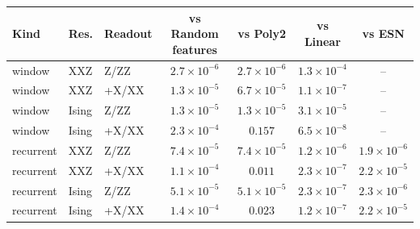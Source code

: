 \begin{tabular}{lllcccc}
\toprule
Kind & Res. & Readout & vs Random features & vs Poly2 & vs Linear & vs ESN \\
\midrule
window & XXZ & Z/ZZ & $2.7\times10^{-6}$ & $2.7\times10^{-6}$ & $1.3\times10^{-4}$ & -- \\
window & XXZ & +X/XX & $1.3\times10^{-5}$ & $6.7\times10^{-5}$ & $1.1\times10^{-7}$ & -- \\
window & Ising & Z/ZZ & $1.3\times10^{-5}$ & $1.3\times10^{-5}$ & $3.1\times10^{-5}$ & -- \\
window & Ising & +X/XX & $2.3\times10^{-4}$ & $0.157$ & $6.5\times10^{-8}$ & -- \\
\midrule
recurrent & XXZ & Z/ZZ & $7.4\times10^{-5}$ & $7.4\times10^{-5}$ & $1.2\times10^{-6}$ & $1.9\times10^{-6}$ \\
recurrent & XXZ & +X/XX & $1.1\times10^{-4}$ & $0.011$ & $2.3\times10^{-7}$ & $2.2\times10^{-5}$ \\
recurrent & Ising & Z/ZZ & $5.1\times10^{-5}$ & $5.1\times10^{-5}$ & $2.3\times10^{-7}$ & $2.3\times10^{-6}$ \\
recurrent & Ising & +X/XX & $1.4\times10^{-4}$ & $0.023$ & $1.2\times10^{-7}$ & $2.2\times10^{-5}$ \\
\bottomrule
\end{tabular}
